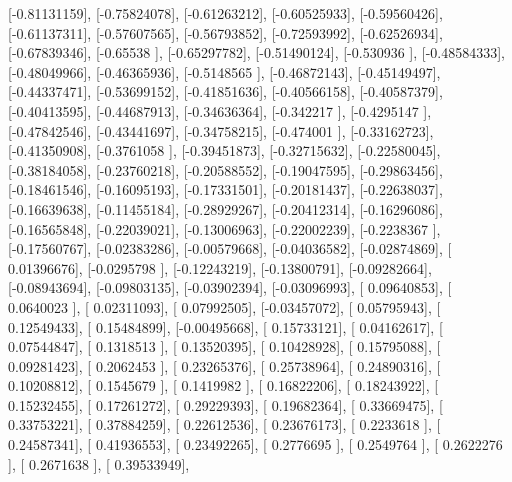 \documentclass{article}
\begin{document}
       [-0.81131159],
       [-0.75824078],
       [-0.61263212],
       [-0.60525933],
       [-0.59560426],
       [-0.61137311],
       [-0.57607565],
       [-0.56793852],
       [-0.72593992],
       [-0.62526934],
       [-0.67839346],
       [-0.65538   ],
       [-0.65297782],
       [-0.51490124],
       [-0.530936  ],
       [-0.48584333],
       [-0.48049966],
       [-0.46365936],
       [-0.5148565 ],
       [-0.46872143],
       [-0.45149497],
       [-0.44337471],
       [-0.53699152],
       [-0.41851636],
       [-0.40566158],
       [-0.40587379],
       [-0.40413595],
       [-0.44687913],
       [-0.34636364],
       [-0.342217  ],
       [-0.4295147 ],
       [-0.47842546],
       [-0.43441697],
       [-0.34758215],
       [-0.474001  ],
       [-0.33162723],
       [-0.41350908],
       [-0.3761058 ],
       [-0.39451873],
       [-0.32715632],
       [-0.22580045],
       [-0.38184058],
       [-0.23760218],
       [-0.20588552],
       [-0.19047595],
       [-0.29863456],
       [-0.18461546],
       [-0.16095193],
       [-0.17331501],
       [-0.20181437],
       [-0.22638037],
       [-0.16639638],
       [-0.11455184],
       [-0.28929267],
       [-0.20412314],
       [-0.16296086],
       [-0.16565848],
       [-0.22039021],
       [-0.13006963],
       [-0.22002239],
       [-0.2238367 ],
       [-0.17560767],
       [-0.02383286],
       [-0.00579668],
       [-0.04036582],
       [-0.02874869],
       [ 0.01396676],
       [-0.0295798 ],
       [-0.12243219],
       [-0.13800791],
       [-0.09282664],
       [-0.08943694],
       [-0.09803135],
       [-0.03902394],
       [-0.03096993],
       [ 0.09640853],
       [ 0.0640023 ],
       [ 0.02311093],
       [ 0.07992505],
       [-0.03457072],
       [ 0.05795943],
       [ 0.12549433],
       [ 0.15484899],
       [-0.00495668],
       [ 0.15733121],
       [ 0.04162617],
       [ 0.07544847],
       [ 0.1318513 ],
       [ 0.13520395],
       [ 0.10428928],
       [ 0.15795088],
       [ 0.09281423],
       [ 0.2062453 ],
       [ 0.23265376],
       [ 0.25738964],
       [ 0.24890316],
       [ 0.10208812],
       [ 0.1545679 ],
       [ 0.1419982 ],
       [ 0.16822206],
       [ 0.18243922],
       [ 0.15232455],
       [ 0.17261272],
       [ 0.29229393],
       [ 0.19682364],
       [ 0.33669475],
       [ 0.33753221],
       [ 0.37884259],
       [ 0.22612536],
       [ 0.23676173],
       [ 0.2233618 ],
       [ 0.24587341],
       [ 0.41936553],
       [ 0.23492265],
       [ 0.2776695 ],
       [ 0.2549764 ],
       [ 0.2622276 ],
       [ 0.2671638 ],
       [ 0.39533949],
\end{document}
